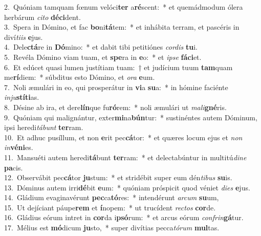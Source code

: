 {2.~}Quóniam tamquam fœnum velóci\textbf{ter} a\textbf{ré}scent:~* et quemádmodum ólera herbárum \textit{ci}\textit{to} \textbf{dé}\textbf{ci}dent.\\
{3.~}Spera in Dómino, et fac \textbf{bo}ni\textbf{tá}tem:~* et inhábita terram, et pascéris in diví\textit{ti}\textit{is} \textbf{e}jus.\\
{4.~}Dele\textbf{ctá}re in \textbf{Dó}mino:~* et dabit tibi petitiónes \textit{cor}\textit{dis} \textbf{tu}i.\\
{5.~}Revéla Dómino viam tuam, et \textbf{spe}ra in \textbf{e}o:~* et \textit{i}\textit{pse} \textbf{fá}\textbf{ci}et.\\
{6.~}Et edúcet quasi lumen justítiam tuam:~† et judícium tuum \textbf{tam}quam me\textbf{rí}diem:~* súbditus esto Dómino, et \textit{o}\textit{ra} \textbf{e}um.\\
{7.~}Noli æmulári in eo, qui prosperátur in \textbf{vi}a \textbf{su}a:~* in hómine faciénte \textit{in}\textit{ju}\textbf{stí}\textbf{ti}as.\\
{8.~}Désine ab ira, et dere\textbf{lín}que fu\textbf{ró}rem:~* noli æmulári ut \textit{ma}\textit{li}\textbf{gné}ris.\\
{9.~}Quóniam qui malignántur, exter\textbf{mi}na\textbf{bún}tur:~* sustinéntes autem Dóminum, ipsi heredi\textit{tá}\textit{bunt} \textbf{ter}ram.\\
{10.~}Et adhuc pusíllum, et non \textbf{e}rit pec\textbf{cá}tor:~* et quæres locum ejus et \textit{non} \textit{in}\textbf{vé}\textbf{ni}es.\\
{11.~}Mansuéti autem heredi\textbf{tá}bunt \textbf{ter}ram:~* et delectabúntur in multitú\textit{di}\textit{ne} \textbf{pa}cis.\\
{12.~}Observábit pec\textbf{cá}tor \textbf{ju}stum:~* et stridébit super eum dén\textit{ti}\textit{bus} \textbf{su}is.\\
{13.~}Dóminus autem irri\textbf{dé}bit \textbf{e}um:~* quóniam próspicit quod véniet \textit{di}\textit{es} \textbf{e}jus.\\
{14.~}Gládium evaginavérunt \textbf{pec}ca\textbf{tó}res:~* intendérunt \textit{ar}\textit{cum} \textbf{su}um,\\
{15.~}Ut dejíciant páupe\textbf{rem} et \textbf{í}nopem:~* ut trucídent \textit{re}\textit{ctos} \textbf{cor}de.\\
{16.~}Gládius eórum intret in \textbf{cor}da i\textbf{psó}rum:~* et arcus eórum \textit{con}\textit{frin}\textbf{gá}tur.\\
{17.~}Mélius est \textbf{mó}dicum \textbf{ju}sto,~* super divítias pecca\textit{tó}\textit{rum} \textbf{mul}tas.\\
